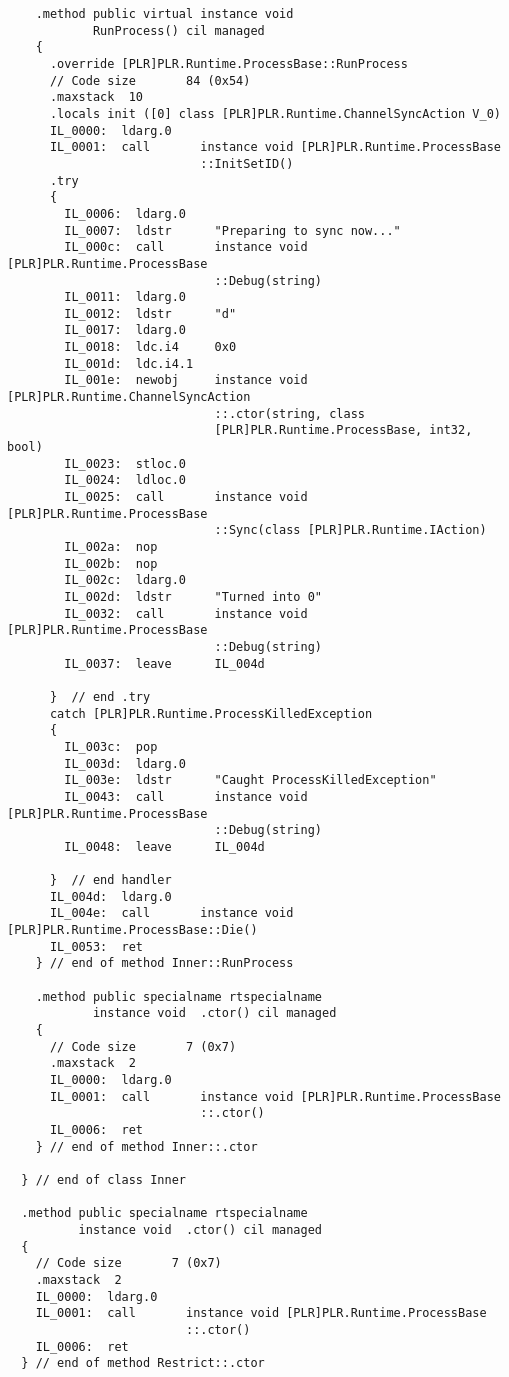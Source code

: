 \begin{lstlisting}
    .method public virtual instance void 
            RunProcess() cil managed
    {
      .override [PLR]PLR.Runtime.ProcessBase::RunProcess
      // Code size       84 (0x54)
      .maxstack  10
      .locals init ([0] class [PLR]PLR.Runtime.ChannelSyncAction V_0)
      IL_0000:  ldarg.0
      IL_0001:  call       instance void [PLR]PLR.Runtime.ProcessBase
                           ::InitSetID()
      .try
      {
        IL_0006:  ldarg.0
        IL_0007:  ldstr      "Preparing to sync now..."
        IL_000c:  call       instance void [PLR]PLR.Runtime.ProcessBase
                             ::Debug(string)
        IL_0011:  ldarg.0
        IL_0012:  ldstr      "d"
        IL_0017:  ldarg.0
        IL_0018:  ldc.i4     0x0
        IL_001d:  ldc.i4.1
        IL_001e:  newobj     instance void [PLR]PLR.Runtime.ChannelSyncAction
                             ::.ctor(string, class 
                             [PLR]PLR.Runtime.ProcessBase, int32, bool)
        IL_0023:  stloc.0
        IL_0024:  ldloc.0
        IL_0025:  call       instance void [PLR]PLR.Runtime.ProcessBase
                             ::Sync(class [PLR]PLR.Runtime.IAction)
        IL_002a:  nop
        IL_002b:  nop
        IL_002c:  ldarg.0
        IL_002d:  ldstr      "Turned into 0"
        IL_0032:  call       instance void [PLR]PLR.Runtime.ProcessBase
                             ::Debug(string)
        IL_0037:  leave      IL_004d

      }  // end .try
      catch [PLR]PLR.Runtime.ProcessKilledException 
      {
        IL_003c:  pop
        IL_003d:  ldarg.0
        IL_003e:  ldstr      "Caught ProcessKilledException"
        IL_0043:  call       instance void [PLR]PLR.Runtime.ProcessBase
                             ::Debug(string)
        IL_0048:  leave      IL_004d

      }  // end handler
      IL_004d:  ldarg.0
      IL_004e:  call       instance void [PLR]PLR.Runtime.ProcessBase::Die()
      IL_0053:  ret
    } // end of method Inner::RunProcess

    .method public specialname rtspecialname 
            instance void  .ctor() cil managed
    {
      // Code size       7 (0x7)
      .maxstack  2
      IL_0000:  ldarg.0
      IL_0001:  call       instance void [PLR]PLR.Runtime.ProcessBase
                           ::.ctor()
      IL_0006:  ret
    } // end of method Inner::.ctor

  } // end of class Inner

  .method public specialname rtspecialname 
          instance void  .ctor() cil managed
  {
    // Code size       7 (0x7)
    .maxstack  2
    IL_0000:  ldarg.0
    IL_0001:  call       instance void [PLR]PLR.Runtime.ProcessBase
                         ::.ctor()
    IL_0006:  ret
  } // end of method Restrict::.ctor


\end{lstlisting}
